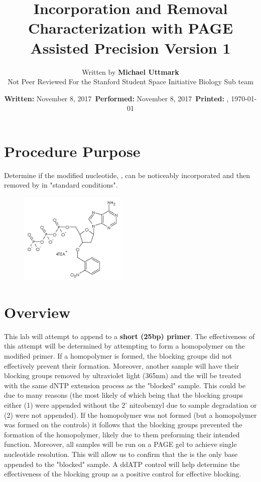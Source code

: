 \documentclass{ssiBio}
\title{\BdATP{} Incorporation and Removal Characterization with PAGE Assisted Precision Version 1} %
\author{Written by \textbf{Michael Uttmark}\\ %
		Not Peer Reviewed %
        For the Stanford Student Space Initiative Biology Sub team}
\date{\textbf{Written:} November 8, 2017 \,\textbf{Performed:} November 8, 2017 \,\textbf{Printed:} \currenttime{}, \today{}}
\begin{document}
\maketitle
\section{Procedure Purpose} %
Determine if the modified nucleotide, \BdATP{}, can be noticeably incorporated and then removed by \tdt{} in "standard conditions".
\begin{figure}[ht]
\centering
\includegraphics[width=2in]{./resources/BdATP-Structure.png}
\caption{\BdATP{}}
\label{bdatp}
\end{figure}
\section{Overview} %
This lab will attempt to append \BdATP{} to a \textbf{short (25bp) primer}. The effectiveness of this attempt will be determined by attempting to form a homopolymer on the modified primer. If a homopolymer is formed, the blocking groups did not effectively prevent their formation. Moreover, another sample will have their blocking groups removed by ultraviolet light (365nm) and the will be treated with the same dNTP extension process as the "blocked" sample. This could be due to many reasons (the most likely of which being that the blocking groups either (1) were appended without the 2' nitrobenzyl due to sample degradation or (2) were not appended). If the homopolymer was not formed (but a homopolymer was formed on the controls) it follows that the blocking groups prevented the formation of the homopolymer, likely due to them preforming their intended function. Moreover, all samples will be run on a PAGE gel to achieve single nucleotide resolution. This will allow us to confirm that the \BdATP{} is the only base appended to the "blocked" sample. A ddATP control will help determine the effectiveness of the blocking group as a positive control for effective blocking.

\end{document}
